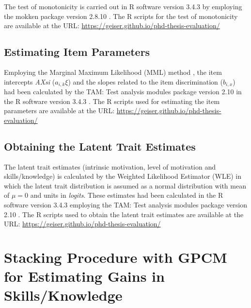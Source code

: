 The test of monotonicity is carried out in R software version 3.4.3 \cite{RCoreTeam2017} by employing the mokken package version 2.8.10 \cite{VanderArk2012,VanderArk2007}. The R scripts for the test of monotonicity are available at the URL: \url{https://geiser.github.io/phd-thesis-evaluation/}

\subsection{Estimating Item Parameters}
\label{sec:estimating-parameters-irt-motivation}

Employing the Marginal Maximum Likelihood (MML) method \cite{BockAitkin1981}, the item intercepts \emph{AXsi} ($a_{i,k} \xi$) and the slopes related to the item discrimination ($b_{i,x}$) had been calculated by the TAM: Test analysis modules package version 2.10 \cite{RobitzschKieferWu2018} in the R software version 3.4.3 \cite{RCoreTeam2017}. The R scripts used for estimating the item parameters are available at the URL: \url{https://geiser.github.io/phd-thesis-evaluation/}

\subsection{Obtaining the Latent Trait Estimates}
\label{sec:obtaining-latent-trait-irt-motivation}

The latent trait estimates (intrinsic motivation, level of motivation and skills/knowledge) is calculated by the Weighted Likelihood Estimator (WLE) \cite{Warm1989} in which the latent trait distribution is assumed as a normal distribution with mean of $\mu = 0$ and units in \emph{logits}. These estimates had been calculated in the R software version 3.4.3 \cite{RCoreTeam2017} employing the TAM: Test analysis modules package version 2.10 \cite{RobitzschKieferWu2018}. The R scripts used to obtain the latent trait estimates are available at the URL: \url{https://geiser.github.io/phd-thesis-evaluation/}


\section{Stacking Procedure with GPCM for Estimating Gains in Skills/Knowledge}
\label{sec:irt-learning-outcomes}


